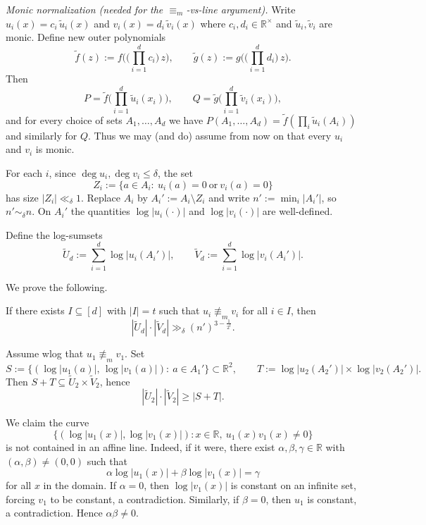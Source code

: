 \documentclass[12pt,reqno]{amsart}
\numberwithin{equation}{section}
\begin{document}
\medskip
\noindent\emph{Monic normalization (needed for the $\equiv_m$-vs-line argument).}
Write $u_i(x)=c_i\,\widetilde u_i(x)$ and $v_i(x)=d_i\,\widetilde v_i(x)$ where $c_i,d_i\in\mathbb R^\times$ and
$\widetilde u_i,\widetilde v_i$ are monic.
Define new outer polynomials
\[
\widetilde f(z):=f\Big(\big(\prod_{i=1}^d c_i\big)\,z\Big),
\qquad
\widetilde g(z):=g\Big(\big(\prod_{i=1}^d d_i\big)\,z\Big).
\]
Then
\[
P=\widetilde f\!\Big(\prod_{i=1}^d \widetilde u_i(x_i)\Big),\qquad
Q=\widetilde g\!\Big(\prod_{i=1}^d \widetilde v_i(x_i)\Big),
\]
and for every choice of sets $A_1,\dots,A_d$ we have
$P(A_1,\dots,A_d)=\widetilde f(\prod_i \widetilde u_i(A_i))$ and similarly for $Q$.
Thus we may (and do) assume from now on that every $u_i$ and $v_i$ is monic.

\medskip
For each $i$, since $\deg u_i,\deg v_i\le \delta$, the set
\[
Z_i:=\{a\in A_i:\ u_i(a)=0 \ \text{or}\ v_i(a)=0\}
\]
has size $|Z_i|\ll_\delta 1$. Replace $A_i$ by $A_i':=A_i\setminus Z_i$ and write
$n':=\min_i |A_i'|$, so $n'\sim_\delta n$. On $A_i'$ the quantities $\log|u_i(\cdot)|$ and $\log|v_i(\cdot)|$ are well-defined.

Define the log-sumsets
\[
\widetilde U_d:=\sum_{i=1}^{d}\log|u_i(A_i')|,
\qquad
\widetilde V_d:=\sum_{i=1}^{d}\log|v_i(A_i')|.
\]

We prove the following.

\smallskip
{}
If there exists $I\subseteq[d]$ with $|I|=t$ such that $u_i\not\equiv_m v_i$ for all $i\in I$, then
\[
|\widetilde U_d|\cdot |\widetilde V_d|\gg_{\delta} (n')^{3-\frac1{2^{t}}}.
\]

\smallskip
{}
Assume wlog that $u_1\not\equiv_m v_1$. Set
\[
S:=\{(\log|u_1(a)|,\,\log|v_1(a)|):\ a\in A_1'\}\subset\mathbb R^2,
\qquad
T:=\log|u_2(A_2')|\times \log|v_2(A_2')|.
\]
Then $S+T\subseteq \widetilde U_2\times \widetilde V_2$, hence
\[
|\widetilde U_2|\cdot |\widetilde V_2|\ge |S+T|.
\]

We claim the curve
\[
\{(\log|u_1(x)|,\log|v_1(x)|): x\in\mathbb R,\ u_1(x)v_1(x)\neq 0\}
\]
is not contained in an affine line.
Indeed, if it were, there exist $\alpha,\beta,\gamma\in\mathbb R$ with $(\alpha,\beta)\neq(0,0)$ such that
\[
\alpha\log|u_1(x)|+\beta\log|v_1(x)|=\gamma
\]
for all $x$ in the domain.
If $\alpha=0$, then $\log|v_1(x)|$ is constant on an infinite set, forcing $v_1$ to be constant, a contradiction.
Similarly, if $\beta=0$, then $u_1$ is constant, a contradiction. Hence $\alpha\beta\neq 0$.
\end{document}
